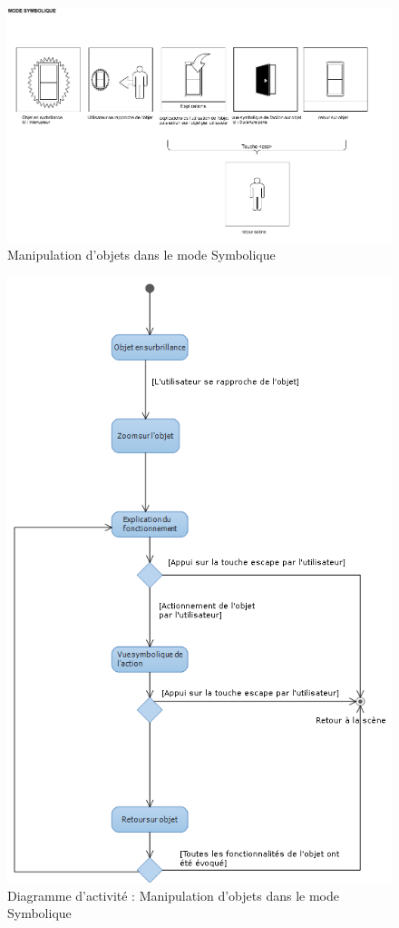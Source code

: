 \begin{figure}[h]
\centering
\includegraphics[width=1\textwidth]{2-Specifications/img-utilisateur/symbolique.png}
\caption{\label{fig:MaquetteSymbolique} Manipulation d'objets dans le mode Symbolique }
\end{figure}
\begin{figure}[h]
\centering
\includegraphics[width=1\textwidth]{2-Specifications/img-utilisateur/activite-symbolique.png}
\caption{\label{fig:CasUsageSymbolique} Diagramme d'activité : Manipulation d'objets dans le mode Symbolique }
\end{figure}
\FloatBarrier


